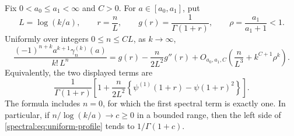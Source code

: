 \begin{theorem}\label{spectral:thm:profile}
Fix \(0<a_0\le a_1<\infty\) and \(C>0\). For
\(a\in[a_0,a_1]\), put
\[
L=\log(k/a),\qquad r=\frac nL,\qquad
g(r)=\frac1{\Gamma(1+r)},\qquad
\rho=\frac{a_1}{a_1+1}<1.
\]
Uniformly over integers \(0\le n\le CL\), as \(k\to\infty\),
\begin{equation}\label{spectral:eq:uniform-profile}
\frac{(-1)^{n+k}a^{k+1}\gamma_n^{(k)}(a)}{k!\,L^n}
=g(r)-\frac{n}{2L^2}g''(r)
 +O_{a_0,a_1,C}\left(\frac n{L^3}+k^{C+1}\rho^k\right).
\end{equation}
Equivalently, the two displayed terms are
\begin{equation}\label{spectral:eq:profile-polygamma}
\frac1{\Gamma(1+r)}
\left[1+\frac{n}{2L^2}
 \left\{\psi^{(1)}(1+r)-\psi(1+r)^2\right\}\right].
\end{equation}
The formula includes \(n=0\), for which the first spectral term is
exactly one. In particular, if \(n/\log(k/a)\to c\ge0\) in a bounded
range, then the left side of \eqref{spectral:eq:uniform-profile} tends to
\(1/\Gamma(1+c)\).
\end{theorem}

